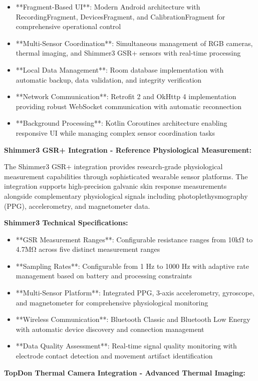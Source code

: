 \documentclass[11pt,a4paper]{report}
\begin{document}
\begin{itemize}
\item **Fragment-Based UI**: Modern Android architecture with RecordingFragment, DevicesFragment, and CalibrationFragment
  for comprehensive operational control
\item **Multi-Sensor Coordination**: Simultaneous management of RGB cameras, thermal imaging, and Shimmer3 GSR+ sensors with
  real-time processing
\item **Local Data Management**: Room database implementation with automatic backup, data validation, and integrity
  verification
\item **Network Communication**: Retrofit 2 and OkHttp 4 implementation providing robust WebSocket communication with
  automatic reconnection
\item **Background Processing**: Kotlin Coroutines architecture enabling responsive UI while managing complex sensor
  coordination tasks

\end{itemize}
\textbf{Shimmer3 GSR+ Integration - Reference Physiological Measurement:}

The Shimmer3 GSR+ integration provides research-grade physiological measurement capabilities through sophisticated
wearable sensor platforms. The integration supports high-precision galvanic skin response measurements alongside
complementary physiological signals including photoplethysmography (PPG), accelerometry, and magnetometer data.

\textbf{Shimmer3 Technical Specifications:}

\begin{itemize}
\item **GSR Measurement Ranges**: Configurable resistance ranges from 10kΩ to 4.7MΩ across five distinct measurement ranges
\item **Sampling Rates**: Configurable from 1 Hz to 1000 Hz with adaptive rate management based on battery and processing
  constraints
\item **Multi-Sensor Platform**: Integrated PPG, 3-axis accelerometry, gyroscope, and magnetometer for comprehensive
  physiological monitoring
\item **Wireless Communication**: Bluetooth Classic and Bluetooth Low Energy with automatic device discovery and connection
  management
\item **Data Quality Assessment**: Real-time signal quality monitoring with electrode contact detection and movement
  artifact identification

\end{itemize}
\textbf{TopDon Thermal Camera Integration - Advanced Thermal Imaging:}
\end{document}
